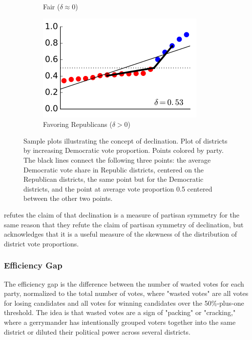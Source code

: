 \begin{figure}
\begin{subfigure}[b]{0.3\textwidth}
        \caption{Fair ($\delta \approx 0$)}
        \label{fig:dec.flat}
    \end{subfigure}
    \begin{subfigure}[b]{0.3\textwidth}
        \centering
        \includegraphics[width=\textwidth]{img/dec.repub.PNG}
        \caption{Favoring Republicans ($\delta > 0$)}
        \label{fig:dec.repub}
    \end{subfigure}
    \caption{Sample plots illustrating the concept of declination. Plot of districts by increasing Democratic vote proportion. Points colored by party. The black lines connect the following three points: the average Democratic vote share in Republic districts, centered on the Republican districts, the same point but for the Democratic districts, and the point at average vote proportion 0.5 centered between the other two points. \parencite[6]{warrington2018}}
    \label{fig:dec}
\end{figure}

\textcite{katz2020} refutes the claim of \textcite{warrington2018} that declination is a measure of partisan symmetry for the same reason that they refute the claim of partisan symmetry of declination, but acknowledges that it is a useful measure of the skewness of the distribution of district vote proportions. 

\subsubsection{Efficiency Gap}
\label{sec:effgap}

The efficiency gap is the difference between the number of wasted votes for each party, normalized to the total number of votes, where "wasted votes" are all votes for losing candidates and all votes for winning candidates over the 50\%-plus-one threshold. The idea is that wasted votes are a sign of "packing" or "cracking," where a gerrymander has intentionally grouped voters together into the same district or diluted their political power across several districts. \parencite{stephanopoulos2014}

